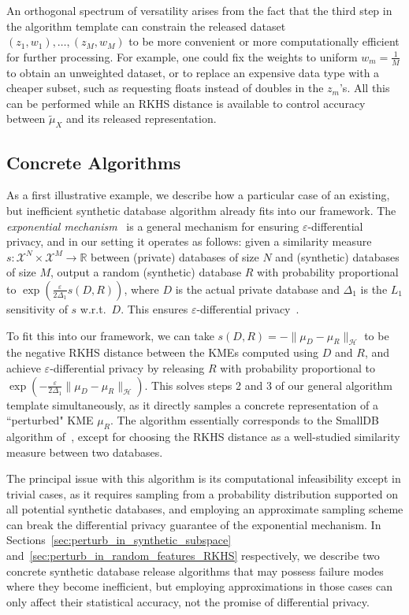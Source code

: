 \documentclass{article}
\newcommand{\calH}{\mathcal{H}}			%
\newcommand{\calX}{\mathcal{X}}			%
\newcommand{\IR}{\mathbb{R}}  			%
\theoremstyle{plain}
\theoremstyle{remark}
\theoremstyle{definition}
\begin{document}
An orthogonal spectrum of versatility arises from the fact that the third step in the algorithm template can constrain the released dataset $(z_1, w_1), \ldots, (z_M, w_M)$ to be more convenient or more computationally efficient for further processing. For example, one could fix the weights to uniform $w_m = \frac{1}{M}$ to obtain an unweighted dataset, or to replace an expensive data type with a cheaper subset, such as requesting floats instead of doubles in the $z_m$'s. All this can be performed while an RKHS distance is available to control accuracy between $\tilde{\mu}_X$ and its released representation.


\subsection{Concrete Algorithms}
\label{sec:framework:concrete}

As a first illustrative example, we describe how a particular case of an existing, but inefficient synthetic database algorithm already fits into our framework. The \emph{exponential mechanism}~\citep{mcsherry_mechanism_2007} is a general mechanism for ensuring $\varepsilon$-differential privacy, and in our setting it operates as follows: given a similarity measure $s : \calX^N \times \calX^M \to \IR$ between (private) databases of size $N$ and (synthetic) databases of size $M$, output a random (synthetic) database $R$ with probability proportional to $\exp( \frac{\varepsilon}{2 \Delta_1} s(D, R))$, where $D$ is the actual private database and $\Delta_1$ is the $L_1$ sensitivity of $s$ w.r.t.~$D$. This ensures $\varepsilon$-differential privacy~\cite{mcsherry_mechanism_2007}.

To fit this into our framework, we can take $s(D, R) = - \| \mu_D - \mu_R \|_{\calH}$ to be the negative RKHS distance between the KMEs computed using $D$ and $R$, and achieve $\varepsilon$-differential privacy by releasing $R$ with probability proportional to $\exp( - \frac{\varepsilon}{2 \Delta_1} \| \mu_D - \mu_R \|_{\calH} )$. This solves steps 2 and 3 of our general algorithm template simultaneously, as it directly samples a concrete representation of a ``perturbed" KME $\mu_R$. The algorithm essentially corresponds to the SmallDB algorithm of~\citet{blum_learning_2008}, except for choosing the RKHS distance as a well-studied similarity measure between two databases.

The principal issue with this algorithm is its computational infeasibility except in trivial cases, as it requires sampling from a probability distribution supported on all potential synthetic databases, and employing an approximate sampling scheme can break the differential privacy guarantee of the exponential mechanism. In Sections~\ref{sec:perturb_in_synthetic_subspace} and~\ref{sec:perturb_in_random_features_RKHS} respectively, we describe two concrete synthetic database release algorithms that may possess failure modes where they become inefficient, but employing approximations in those cases can only affect their statistical accuracy, not the promise of differential privacy.
\end{document}
